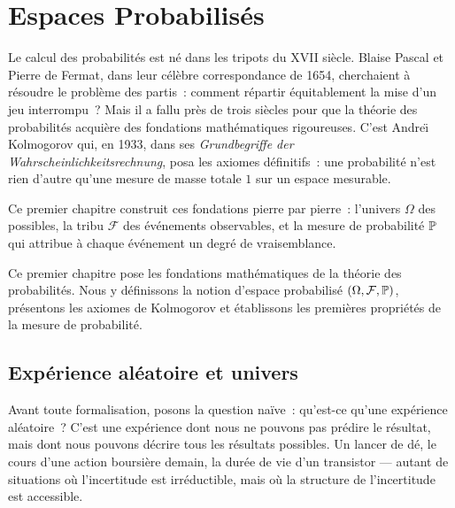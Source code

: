\chapter{Espaces Probabilis\'es}
\label{ch:espaces}

Le calcul des probabilit\'es est n\'e dans les tripots du XVII\ieme{} si\`ecle.
Blaise Pascal et Pierre de Fermat, dans leur c\'el\`ebre correspondance de
1654, cherchaient \`a r\'esoudre le \og probl\`eme des partis\fg~: comment
r\'epartir \'equitablement la mise d'un jeu interrompu~? Mais il a fallu
pr\`es de trois si\`ecles pour que la th\'eorie des probabilit\'es acqui\`ere des
fondations math\'ematiques rigoureuses. C'est Andre\"\i{} Kolmogorov qui, en
1933, dans ses \emph{Grundbegriffe der Wahrscheinlichkeitsrechnung}, posa
les axiomes d\'efinitifs~: une probabilit\'e n'est rien d'autre qu'une mesure
de masse totale $1$ sur un espace mesurable.

Ce premier chapitre construit ces fondations pierre par pierre~: l'univers
$\Omega$ des possibles, la tribu $\mathcal{F}$ des \'ev\'enements
observables, et la mesure de probabilit\'e $\mathbb{P}$ qui attribue \`a chaque
\'ev\'enement un degr\'e de vraisemblance.

\begin{intuition}
Ce premier chapitre pose les fondations math\'ematiques de la th\'eorie des probabilit\'es.
Nous y d\'efinissons la notion d'espace probabilis\'e $(\Omega, \mathcal{F}, \mathbb{P})$,
pr\'esentons les axiomes de Kolmogorov et \'etablissons les premi\`eres propri\'et\'es
de la mesure de probabilit\'e.
\end{intuition}

\section{Exp\'erience al\'eatoire et univers}

Avant toute formalisation, posons la question na\"ive~: qu'est-ce qu'une
exp\'erience al\'eatoire~? C'est une exp\'erience dont nous ne pouvons pas
pr\'edire le r\'esultat, mais dont nous pouvons d\'ecrire tous les r\'esultats
possibles. Un lancer de d\'e, le cours d'une action boursi\`ere demain, la
dur\'ee de vie d'un transistor --- autant de situations o\`u l'incertitude
est irr\'eductible, mais o\`u la structure de l'incertitude est accessible.

